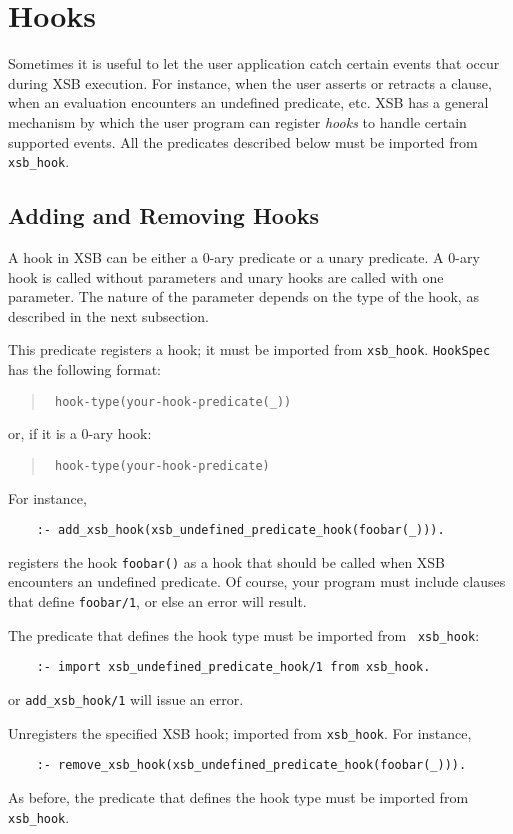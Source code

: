 \chapter{Hooks} \label{hooks}

Sometimes it is useful to let the user application catch certain
events that occur during XSB execution. For instance, when the user
asserts or retracts a clause, when an evaluation encounters an
undefined predicate, etc.  XSB has a general mechanism by which the
user program can register \emph{hooks} to handle certain supported
events. All the predicates described below must be imported from {\tt
xsb\_hook}.

\section{Adding and Removing Hooks}

A hook in XSB can be either a 0-ary predicate or a unary predicate.
A 0-ary hook is called without parameters and unary hooks are called with
one parameter. The nature of the parameter depends on the type of the hook,
as described in the next subsection.


\begin{description}
  

This predicate registers a hook; it must be imported from {\tt xsb\_hook}.
{\tt HookSpec} has the following format:
\begin{quote}
 {\tt
   hook-type(your-hook-predicate(\_))
   }
\end{quote}
or, if it is a 0-ary hook:
\begin{quote}
  {\tt
   hook-type(your-hook-predicate)
   }  
\end{quote}
For instance, 
\begin{verbatim}
    :- add_xsb_hook(xsb_undefined_predicate_hook(foobar(_))).
\end{verbatim}
registers the hook {\tt foobar()} as a hook that should be called when XSB
encounters an undefined predicate. Of course, your program must include
clauses that define {\tt foobar/1}, or else an error will result.

The predicate that defines the hook type must be imported from {\tt
  xsb\_hook}:
\begin{verbatim}
    :- import xsb_undefined_predicate_hook/1 from xsb_hook.  
\end{verbatim}
or {\tt add\_xsb\_hook/1} will issue an error.

 

Unregisters the specified XSB hook; imported from {\tt xsb\_hook}. For
instance,
\begin{verbatim}
    :- remove_xsb_hook(xsb_undefined_predicate_hook(foobar(_))).
\end{verbatim}
As before, the predicate that defines the hook type must be imported from
{\tt xsb\_hook}.
\end{description}


